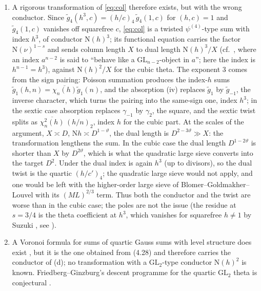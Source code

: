\documentclass[11pt]{article}
\newcommand{\N}{\mathrm N}
\begin{document}
\begin{enumerate}
\item[(d)] [DERIVED, from (c)] A rigorous transformation of \eqref{eq:col} therefore exists, but with the wrong conductor. Since $\tilde g_4(h^3,c)=(h/c)_4\,\tilde g_4(1,c)$ for $(h,c)=1$ and $\tilde g_4(1,c)$ vanishes off squarefree $c$, \eqref{eq:col} is a twisted $\psi^{(4)}$-type sum with index $h^3$, of conductor $\N(h)^3$; its functional equation carries the factor $\N(\nu)^{1-s}$ and sends column length $X$ to dual length $\N(h)^3/X$ (cf.\ \cite[\S1.2]{DDHL}, where an index $a^{n-2}$ is said to ``behave like a $\mathrm{GL}_{n-2}$-object in $a$''; here the index is $h^{n-1}=h^3$), against $\N(h)^2/X$ for the cubic theta. The exponent $3$ comes from the sign pairing: Poisson summation produces the index-$h$ sums $\tilde g_1(h,n)=\overline{\chi_n(h)}\tilde g_1(n)$, and the absorption (iv) replaces $\tilde g_1$ by $\tilde g_{-1}$, the inverse character, which turns the pairing into the same-sign one, index $h^3$; in the sextic case absorption replaces $\gamma_{-1}$ by $\gamma_2$, the square, and the sextic twist splits as $\overline{\chi^2_n(h)}\,(h/n)_2$, index $h$ for the cubic part. At the scales of the argument, $X\asymp D$, $\N h\asymp D^{1-\vartheta}$, the dual length is $D^{2-3\vartheta}\gg X$: the transformation lengthens the sum. In the cubic case the dual length $D^{1-2\vartheta}$ is shorter than $X$ by $D^{2\vartheta}$, which is what the quadratic large sieve converts into the target $D^2$. Under \cite[(4.28)]{DDHL} the dual index is again $h^3$ (up to divisors), so the dual twist is the quartic $(h/c')_4$; the quadratic large sieve would not apply, and one would be left with the higher-order large sieve of Blomer--Goldmakher--Louvel with its $(ML)^{2/3}$ term. Thus both the conductor and the twist are worse than in the cubic case; the poles are not the issue (the residue at $s=3/4$ is the theta coefficient at $h^3$, which vanishes for squarefree $h\ne1$ by Suzuki \cite[Thm.~4]{Suz83}, see \cite[(4.38)]{DDHL}).
\item[(e)] [LIT] A Voronoi formula for sums of quartic Gauss sums with level structure does exist \cite[Lemma~9.2]{DDHL}, but it is the one obtained from (4.28) and therefore carries the conductor of (d); no transformation with a $\mathrm{GL}_2$-type conductor $\N(h)^2$ is known. Friedberg--Ginzburg's descent programme for the quartic $\mathrm{GL}_2$ theta is conjectural \cite{FG14b}.
\end{enumerate}
\end{document}
